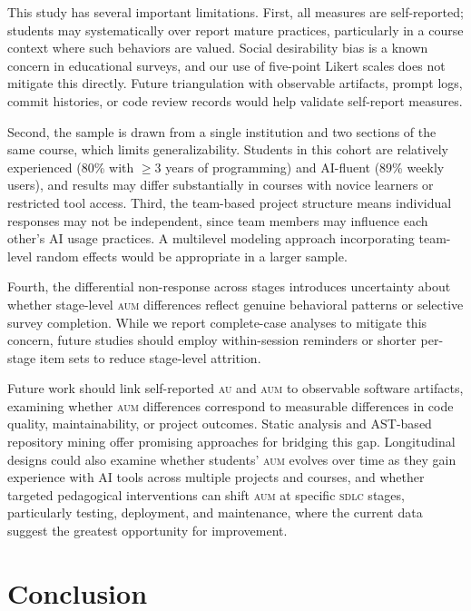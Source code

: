 \documentclass[sigconf,anonymous]{acmart}
\newcommand{\AUM}{\textsc{aum}\xspace}
\newcommand{\AU}{\textsc{au}\xspace}
\newcommand{\SDLC}{\textsc{sdlc}\xspace}
\begin{document}
This study has several important limitations. First, all measures are
self-reported; students may systematically over report mature practices,
particularly in a course context where such behaviors are valued. Social
desirability bias is a known concern in educational surveys, and our use
of five-point Likert scales does not mitigate this directly. Future
triangulation with observable artifacts, prompt logs, commit histories,
or code review records would help validate self-report measures.

Second, the sample is drawn from a single institution and two sections
of the same course, which limits generalizability. Students in this
cohort are relatively experienced (80\% with $\geq 3$ years of
programming) and AI-fluent (89\% weekly users), and results may differ
substantially in courses with novice learners or restricted tool access.
Third, the team-based project structure means individual responses may
not be independent, since team members may influence each other's AI
usage practices. A multilevel modeling approach incorporating team-level
random effects would be appropriate in a larger sample.

Fourth, the differential non-response across stages introduces
uncertainty about whether stage-level \AUM differences reflect genuine
behavioral patterns or selective survey completion. While we report
complete-case analyses to mitigate this concern, future studies should
employ within-session reminders or shorter per-stage item sets to
reduce stage-level attrition.

Future work should link self-reported \AU and \AUM to observable
software artifacts, examining whether \AUM differences correspond to
measurable differences in code quality, maintainability, or project
outcomes. Static analysis and AST-based repository mining offer
promising approaches for bridging this gap. Longitudinal designs could
also examine whether students' \AUM evolves over time as they gain
experience with AI tools across multiple projects and courses,
and whether targeted pedagogical interventions can shift \AUM at
specific \SDLC stages, particularly testing, deployment, and
maintenance, where the current data suggest the greatest opportunity
for improvement.

\section{Conclusion}
\label{sec:conclusion}
\end{document}

